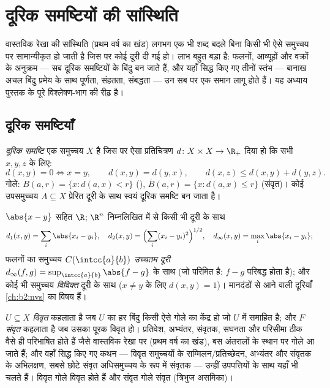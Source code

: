 \chapter{दूरिक समष्टियों की सांस्थिति}\label{ch:b2:metric}

वास्तविक रेखा की सांस्थिति (प्रथम वर्ष का खंड) लगभग एक भी शब्द बदले बिना
किसी भी ऐसे समुच्चय पर सामान्यीकृत हो जाती है जिस पर कोई दूरी दी गई हो।
लाभ बहुत बड़ा है: फलनों, आव्यूहों और वक्रों के अनुक्रम --- सब दूरिक
समष्टियों के बिंदु बन जाते हैं, और यहाँ सिद्ध किए गए तीनों स्तंभ ---
बानाख अचल बिंदु प्रमेय के साथ पूर्णता, संहतता, संबद्धता --- उन सब पर एक
समान लागू होते हैं। यह अध्याय पुस्तक के पूरे विश्लेषण-भाग की रीढ़ है।

\section{दूरिक समष्टियाँ}

\begin{definition}\label{def:b2:metric:def}
\emph{दूरिक समष्टि} एक समुच्चय $X$ है जिस पर ऐसा
प्रतिचित्रण $d
\colon X \times X \to \R_+$ दिया हो कि सभी $x, y, z$ के लिए:
\[
d(x,y) = 0 \iff x = y,
\qquad
d(x,y) = d(y,x),
\qquad
d(x,z) \leq d(x,y) + d(y,z).
\]
गोले: $B(a, r) = \{x : d(a,x) < r\}$ (), $\overline B(a,r) =
\{x : d(a,x) \leq r\}$ (संवृत)। कोई उपसमुच्चय $A \subseteq X$ प्रेरित दूरी के साथ
स्वयं दूरिक समष्टि बन जाता है।
\end{definition}

\begin{example}\label{ex:b2:metric:examples}
$\abs{x - y}$ सहित $\R$; $\R^n$ निम्नलिखित में से किसी भी दूरी के साथ
\[
d_1(x,y) = \sum_i \abs{x_i - y_i},
\quad
d_2(x,y) = \Bigl(\sum_i (x_i - y_i)^2\Bigr)^{1/2},
\quad
d_\infty(x,y) = \max_i \abs{x_i - y_i};
\]
 फलनों का समुच्चय $C(\intcc{a}{b})$ \emph{उच्चतम दूरी} $d_\infty(f, g) = \sup_{\intcc{a}{b}} \abs{f -
g}$ के साथ (जो परिमित है:
$f - g$ परिबद्ध होता है); और कोई भी समुच्चय \emph{विविक्त} दूरी के साथ
($x \neq y$ के लिए $d(x,y) = 1$)। मानदंडों से आने वाली दूरियाँ \cref{ch:b2:nvs} का विषय हैं।
\end{example}

\begin{definition}[दूरिक समष्टि की सांस्थिति]\label{def:b2:metric:topology}
$U \subseteq X$ \emph{विवृत} कहलाता है जब $U$
का हर बिंदु किसी ऐसे गोले का केंद्र हो जो $U$ में समाहित है; और $F$
\emph{संवृत} कहलाता है जब उसका पूरक विवृत हो। प्रतिवेश, अभ्यंतर,
संवृतक, सघनता और परिसीमा ठीक वैसे ही परिभाषित होते हैं जैसे वास्तविक
रेखा पर (प्रथम वर्ष का खंड), बस अंतरालों के स्थान पर गोले आ जाते हैं;
और वहाँ सिद्ध किए गए कथन --- विवृत समुच्चयों के सम्मिलन/प्रतिच्छेदन,
अभ्यंतर और संवृतक के अभिलक्षण, सबसे छोटे संवृत अधिसमुच्चय के रूप में
संवृतक --- उन्हीं उपपत्तियों के साथ यहाँ भी चलते हैं। विवृत गोले विवृत
होते हैं और संवृत गोले संवृत (त्रिभुज असमिका)।
\end{definition}

